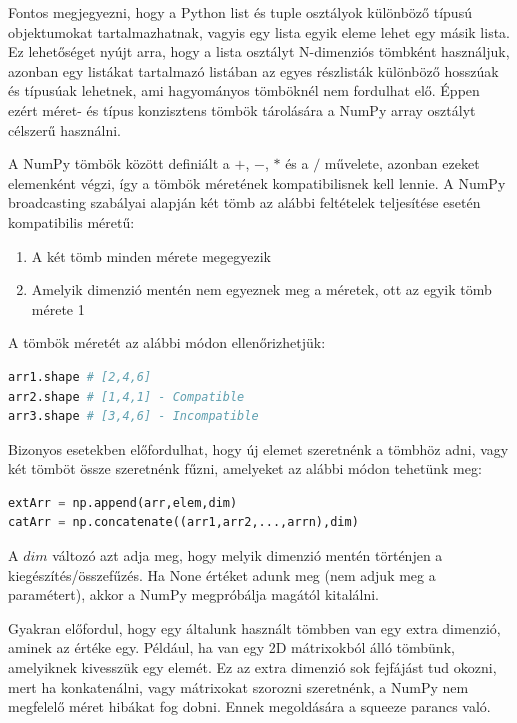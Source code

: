 \documentclass[12pt,a4paper,oneside]{report}             %
\begin{document}
Fontos megjegyezni, hogy a Python list és tuple osztályok különböző típusú objektumokat tartalmazhatnak, vagyis egy lista egyik eleme lehet egy másik lista. Ez lehetőséget nyújt arra, hogy a lista osztályt N-dimenziós tömbként használjuk, azonban egy listákat tartalmazó listában az egyes részlisták különböző hosszúak és típusúak lehetnek, ami hagyományos tömböknél nem fordulhat elő. Éppen ezért méret- és típus konzisztens tömbök tárolására a NumPy array osztályt célszerű használni.

A NumPy tömbök között definiált a $+$, $-$, $*$ és a $/$ művelete, azonban ezeket elemenként végzi, így a tömbök méretének kompatibilisnek kell lennie. A NumPy broadcasting szabályai alapján két tömb az alábbi feltételek teljesítése esetén kompatibilis méretű:

\begin{enumerate}
	\item A két tömb minden mérete megegyezik
	\item Amelyik dimenzió mentén nem egyeznek meg a méretek, ott az egyik tömb mérete 1
\end{enumerate}

A tömbök méretét az alábbi módon ellenőrizhetjük:

\begin{lstlisting}[language=Python]
arr1.shape # [2,4,6]
arr2.shape # [1,4,1] - Compatible
arr3.shape # [3,4,6] - Incompatible
\end{lstlisting}

Bizonyos esetekben előfordulhat, hogy új elemet szeretnénk a tömbhöz adni, vagy két tömböt össze szeretnénk fűzni, amelyeket az alábbi módon tehetünk meg:

\begin{lstlisting}[language=Python]
extArr = np.append(arr,elem,dim)
catArr = np.concatenate((arr1,arr2,...,arrn),dim)
\end{lstlisting}

A $dim$ változó azt adja meg, hogy melyik dimenzió mentén történjen a kiegészítés/összefűzés. Ha None értéket adunk meg (nem adjuk meg a paramétert), akkor a NumPy megpróbálja magától kitalálni.

Gyakran előfordul, hogy egy általunk használt tömbben van egy extra dimenzió, aminek az értéke egy. Például, ha van egy 2D mátrixokból álló tömbünk, amelyiknek kivesszük egy elemét. Ez az extra dimenzió sok fejfájást tud okozni, mert ha konkatenálni, vagy mátrixokat szorozni szeretnénk, a NumPy nem megfelelő méret hibákat fog dobni. Ennek megoldására a squeeze parancs való.
\end{document}

